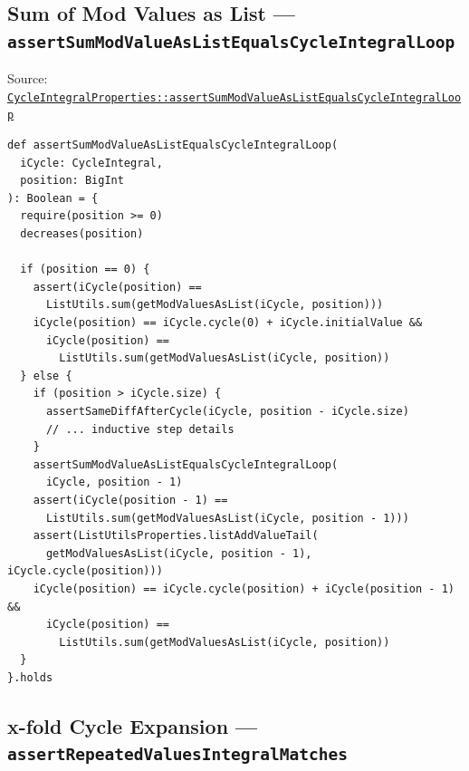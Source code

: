 \subsection{Sum of Mod Values as List --- \texorpdfstring{\texttt{assert\allowbreak Sum\allowbreak Mod\allowbreak Value\allowbreak As\allowbreak List\allowbreak Equals\allowbreak Cycle\allowbreak Integral\allowbreak Loop}}{assertSumModValueAsListEqualsCycleIntegralLoop}}

{\raggedright Source: \href{https://github.com/thiagomata/prime-numbers/blob/integral-cycle-article-v1.0.0/src/main/scala/v1/chapter4/cycle/integral/recursive/properties/CycleIntegralProperties.scala}{\texttt{Cycle\allowbreak Integral\allowbreak Properties::assert\allowbreak Sum\allowbreak Mod\allowbreak Value\allowbreak As\allowbreak List\allowbreak Equals\allowbreak Cycle\allowbreak Integral\allowbreak Loop}}\par}

\begin{lstlisting}[style=scala]
def assertSumModValueAsListEqualsCycleIntegralLoop(
  iCycle: CycleIntegral,
  position: BigInt
): Boolean = {
  require(position >= 0)
  decreases(position)

  if (position == 0) {
    assert(iCycle(position) ==
      ListUtils.sum(getModValuesAsList(iCycle, position)))
    iCycle(position) == iCycle.cycle(0) + iCycle.initialValue &&
      iCycle(position) ==
        ListUtils.sum(getModValuesAsList(iCycle, position))
  } else {
    if (position > iCycle.size) {
      assertSameDiffAfterCycle(iCycle, position - iCycle.size)
      // ... inductive step details
    }
    assertSumModValueAsListEqualsCycleIntegralLoop(
      iCycle, position - 1)
    assert(iCycle(position - 1) ==
      ListUtils.sum(getModValuesAsList(iCycle, position - 1)))
    assert(ListUtilsProperties.listAddValueTail(
      getModValuesAsList(iCycle, position - 1), iCycle.cycle(position)))
    iCycle(position) == iCycle.cycle(position) + iCycle(position - 1) &&
      iCycle(position) ==
        ListUtils.sum(getModValuesAsList(iCycle, position))
  }
}.holds
\end{lstlisting}

\subsection{x-fold Cycle Expansion --- \texorpdfstring{\texttt{assert\allowbreak Repeated\allowbreak Values\allowbreak Integral\allowbreak Matches}}{assertRepeatedValuesIntegralMatches}}

